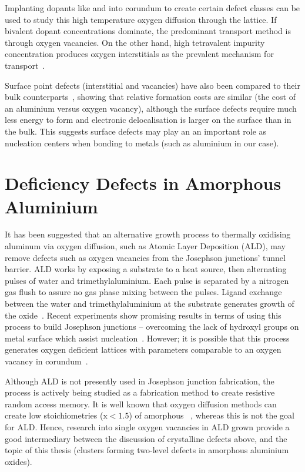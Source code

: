 Implanting dopants like  and  into corundum to create certain defect classes can be used to study this high temperature oxygen diffusion through the lattice.
If bivalent dopant concentrations dominate, the predominant transport method is through oxygen vacancies.
On the other hand, high tetravalent impurity concentration produces  oxygen interstitials as the prevalent mechanism for transport~\cite{Heuer1999}.

Surface point defects (interstitial and vacancies) have also been compared to their bulk counterparts~\cite{Carrasco2004}, showing that relative formation costs are similar (\ie the cost of an aluminium versus oxygen vacancy), although the surface defects require much less energy to form and electronic delocalisation is larger on the surface than in the bulk.
This suggests surface defects may play an an important role as nucleation centers when bonding to metals (such as aluminium in our case).

\section{Deficiency Defects in Amorphous Aluminium}

It has been suggested that an alternative growth process to thermally oxidising aluminum via oxygen diffusion, such as Atomic Layer Deposition (ALD), may remove defects such as oxygen vacancies from the Josephson junctions' tunnel barrier.
ALD works by exposing a substrate to a heat source, then alternating pulses of water and trimethylaluminium.
Each pulse is separated by a nitrogen gas flush to assure no gas phase mixing between the pulses.
Ligand exchange between the water and trimethylaluminium at the substrate generates growth of the oxide~\cite{George2010}.
Recent experiments show promising results in terms of using this process to build Josephson junctions -- overcoming the lack of hydroxyl groups on metal surface which assist nucleation~\cite{Elliot2013}.
However; it is possible that this process generates oxygen deficient lattices with parameters comparable to an oxygen vacancy in corundum~\cite{Perevalov2010}.

Although ALD is not presently used in Josephson junction fabrication, the process is actively being studied as a fabrication method to create resistive random access memory.
It is well known that oxygen diffusion methods can create low stoichiometries (\ie $\text{x}<1.5$) of amorphous ~\cite{Park2002, Tan2005}, whereas this is not the goal for ALD.
Hence, research into single oxygen vacancies in ALD grown  provide a good intermediary between the discussion of crystalline defects above, and the topic of this thesis (clusters forming two-level defects in amorphous aluminium oxides).


